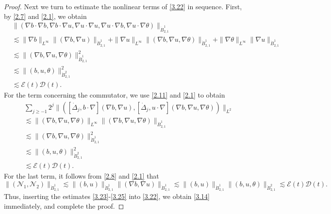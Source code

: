 \documentclass[10pt,a4paper]{amsart}
\numberwithin{equation}{section}
\begin{document}
\begin{proof}
Next we turn to estimate the nonlinear terms of \eqref{3.22} in sequence. 
First, by \eqref{2.7} and \eqref{2.1}, we obtain
 \begin{equation}\label{3.23}
\begin{aligned}
&\|(\nabla b\cdot\nabla b,\nabla b\cdot\nabla u,\nabla u
 \cdot\nabla u,\nabla u\cdot\nabla b,\nabla u\cdot\nabla \theta)\|_{\dot{B}^1_{2,1}} \\
&\lesssim\|\nabla b\|_{L^\infty}\|(\nabla b,\nabla u)\|_{\dot{B}^1_{2,1}}
 +\|\nabla u\|_{L^\infty}\|(\nabla b,\nabla u,\nabla\theta)\|_{\dot{B}^1_{2,1}}
 +\|\nabla \theta\|_{L^\infty}\|\nabla u\|_{\dot{B}^1_{2,1}} \\
&\lesssim\|(\nabla b,\nabla u,\nabla\theta)\|_{\dot{B}^1_{2,1}}^2 \\
&\lesssim\|( b, u,\theta)\|_{\dot{B}^2_{2,1}}^2 \\
&\lesssim\mathcal{E}(t)\mathcal{D}(t).
\end{aligned}
\end{equation}
For the term concerning the commutator, we use \eqref{2.11} and \eqref{2.1} to obtain
\begin{equation}\label{3.24}
\begin{aligned}
&\sum_{j\geqslant-1}2^j\|([\dot{\Delta}_j,b\cdot\nabla](\nabla b,\nabla u),
 [\dot{\Delta}_j,u\cdot\nabla](\nabla b,\nabla u,\nabla\theta))\|_{L^2} \\
&\lesssim\|(\nabla b,\nabla u,\nabla\theta)\|_{L^\infty}\|(\nabla b,\nabla u,
 \nabla\theta)\|_{\dot{B}^1_{2,1}} \\
&\lesssim\|(\nabla b,\nabla u,\nabla\theta)\|_{\dot{B}^1_{2,1}}^2 \\
&\lesssim\|( b, u,\theta)\|_{\dot{B}^2_{2,1}}^2 \\
&\lesssim\mathcal{E}(t)\mathcal{D}(t).
\end{aligned}
\end{equation}
For the last term, it follows from \eqref{2.8} and \eqref{2.1} that
\begin{equation}\label{3.25}
 \|( \mathcal{N}_1, \mathcal{N}_2)\|_{\dot{B}^1_{2,1}}
 \lesssim \|( b, u)\|_{\dot{B}^1_{2,1}}\|(\nabla b,\nabla u)\|_{\dot{B}^1_{2,1}}
 \lesssim \|( b, u)\|_{\dot{B}^1_{2,1}}\|( b, u,\theta)\|_{\dot{B}^2_{2,1}} 
 \lesssim \mathcal{E}(t)\mathcal{D}(t).
\end{equation}
Thus, inserting the estimates \eqref{3.23}-\eqref{3.25} into \eqref{3.22}, 
we obtain \eqref{3.14} immediately, and complete the proof.
\end{proof}
\end{document}
